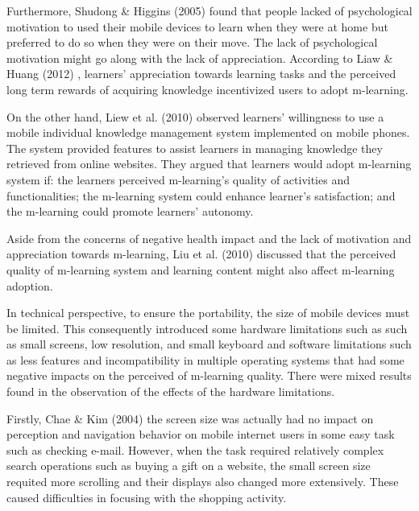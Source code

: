 Furthermore, Shudong \& Higgins (2005) \cite{shudong2005limitations} found that people lacked of psychological motivation to used their mobile devices to learn when they were at home but preferred to do so when they were on their move. The lack of psychological motivation might go along with the lack of appreciation. According to Liaw \& Huang (2012) \cite{liaw2012case}, learners' appreciation towards learning tasks and the perceived long term rewards of acquiring knowledge incentivized users to adopt m-learning. 

On the other hand, Liew et al. (2010) \cite{liaw2010investigating} observed learners' willingness to use a mobile individual knowledge management system implemented on mobile phones. The system provided features to assist learners in managing knowledge they retrieved from online websites. They argued that learners would adopt m-learning system if: the learners perceived m-learning's quality of activities and functionalities; the m-learning system could enhance learner's satisfaction; and the m-learning could promote learners' autonomy. 

Aside from the concerns of negative health impact and the lack of motivation and appreciation towards m-learning, Liu et al. (2010) \cite{liu2010understanding} discussed that the perceived quality of m-learning system and learning content might also affect m-learning adoption. 

In technical perspective, to ensure the portability, the size of mobile devices must be limited. This consequently introduced some hardware limitations such as such as small screens, low resolution, and small keyboard and software limitations such as less features and incompatibility in multiple operating systems that had some negative impacts on the perceived of m-learning quality. There were mixed results found in the observation of the effects of the hardware limitations. 

Firstly, Chae \& Kim (2004) \cite{chae2004size} the screen size was actually had no impact on perception and navigation behavior on mobile internet users in some easy task such as checking e-mail. However, when the task required relatively complex search operations such as buying a gift on a website, the small screen size requited more scrolling and their displays also changed more extensively. These caused difficulties in focusing with the shopping activity. 

